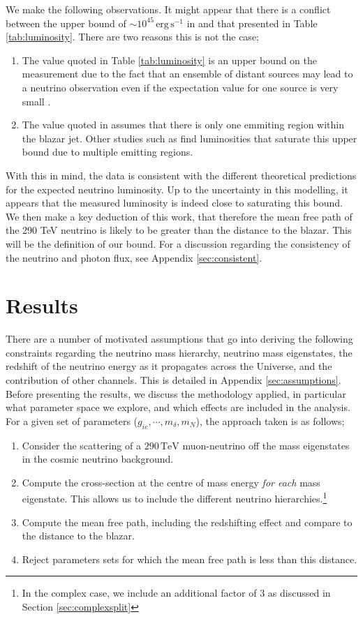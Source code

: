 We make the following observations. It might appear that there is a conflict between the upper bound of $\sim 10^{45} \,\textrm{erg}\,\textrm{s}^{-1}$ in \cite{Padovani2019} and that presented in Table \ref{tab:luminosity}. There are two reasons this is not the case;
\begin{enumerate}
    \item The value quoted in Table \ref{tab:luminosity} is an upper bound on the measurement due to the fact that an ensemble of distant sources may lead to a neutrino observation even if the expectation value for one source is very small \cite{Padovani2019}.
    \item The value quoted in \cite{Padovani2019} assumes that there is only one emmiting region within the blazar jet. Other studies such as \cite{Murase2014} find luminosities that saturate this upper bound due to multiple emitting regions.
\end{enumerate}
With this in mind, the data is consistent with the different theoretical predictions for the expected neutrino luminosity. Up to the uncertainty in this modelling, it appears that the measured luminosity is indeed close to saturating this bound. We then make a key deduction of this work, that therefore the mean free path of the 290 TeV neutrino is likely to be greater than the distance to the blazar. This will be the definition of our bound. For a discussion regarding the consistency of the neutrino and photon flux, see Appendix \ref{sec:consistent}.

\section{Results}

There are a number of motivated assumptions that go into deriving the following constraints regarding the neutrino mass hierarchy, neutrino mass eigenstates, the redshift of the neutrino energy as it propagates across the Universe, and the contribution of other channels. This is detailed in Appendix \ref{sec:assumptions}. Before presenting the results, we discuss the methodology applied, in particular what parameter space we explore, and which effects are included in the analysis. For a given set of parameters ($g_{ie}, \cdots, m_\delta, m_N$), the approach taken is as follows;
\begin{enumerate}
  \item Consider the scattering of a $290 \, \textrm{TeV}$ muon-neutrino off the mass eigenstates in the cosmic neutrino background.
  \item Compute the cross-section at the centre of mass energy \emph{for each} mass eigenstate. This allows us to include the different neutrino hierarchies.\footnote{In the complex case, we include an additional factor of $3$ as discussed in Section \ref{sec:complexsplit}}
  \item Compute the mean free path, including the redshifting effect and compare to the distance to the blazar.
  \item Reject parameters sets for which the mean free path is less than this distance.
\end{enumerate}

